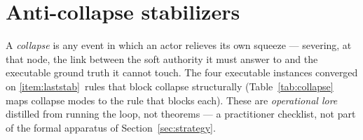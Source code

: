\documentclass[11pt]{article}
\begin{document}
\section{Anti-collapse stabilizers}
\label{app:stabilizers}

A \emph{collapse} is any event in which an actor relieves its own squeeze --- severing, at that node, the
link between the soft authority it must answer to and the executable ground truth it cannot touch. The
four executable instances converged on \ref{item:laststab}~rules that block collapse structurally
(Table~\ref{tab:collapse} maps collapse modes to the rule that blocks each). These are \emph{operational
lore} distilled from running the loop, not theorems --- a practitioner checklist, not part of the formal
apparatus of Section~\ref{sec:strategy}.
\end{document}

